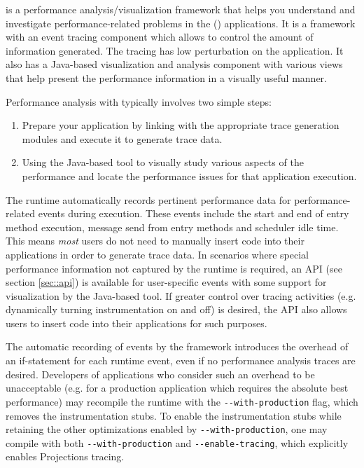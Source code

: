 \projections{} is a performance analysis/visualization framework that
helps you understand and investigate performance-related problems in
the (\charmpp{}) applications. It is a framework with an
event tracing component which allows to control the
amount of information generated. The tracing has low perturbation 
on the application. It
also has a Java-based visualization and analysis component with
various views that help present the performance information in a
visually useful manner.

Performance analysis with \projections{} typically involves two simple
steps:

\begin{enumerate}
\item 
Prepare your application by linking with the appropriate trace
generation modules and execute it to generate trace data.
\item
Using the Java-based tool to visually study various aspects of the
performance and locate the performance issues for that application execution.
\end{enumerate}

The \charmpp{} runtime automatically records pertinent performance
data for performance-related events during execution. These
events include the start and end of entry method execution, message
send from entry methods and scheduler idle time. This means {\em
most} users do not need to manually insert code into their
applications in order to generate trace data. In scenarios where
special performance information not captured by the runtime is
required, an API (see section \ref{sec::api}) is available for
user-specific events with some support for visualization by the
Java-based tool. If greater control over tracing activities
(e.g. dynamically turning instrumentation on and off) is desired, the
API also allows users to insert code into their applications for such
purposes.

The automatic recording of events by the \projections{} framework
introduces the overhead of an if-statement for each runtime event,
even if no performance analysis traces are desired. Developers of
\charmpp{} applications who consider such an overhead to be
unacceptable (e.g. for a production application which requires the
absolute best performance) may recompile the \charmpp{} runtime with
the \verb|--with-production| flag, which removes the instrumentation
stubs.  To enable the instrumentation stubs while retaining the other
optimizations enabled by \verb|--with-production|, one may
compile \charmpp{} with both \verb|--with-production|
and \verb|--enable-tracing|, which explicitly enables Projections tracing.


